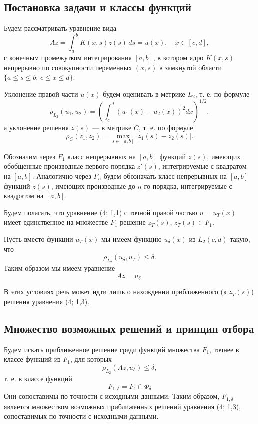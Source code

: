 \documentclass[a4paper,14pt]{extarticle}
\begin{document}
\subsection{Постановка задачи и классы функций}

Будем рассматривать уравнение вида
\begin{equation}
Az = \int_a^b K(x,s) z(s) \, ds = u(x), \quad x \in [c,d], \tag{4; 1,1}
\end{equation}
с конечным промежутком интегрирования \([a,b]\), в котором ядро \(K(x,s)\) непрерывно по совокупности переменных \((x,s)\) в замкнутой области \(\{a \le s \le b; \, c \le x \le d\}\).

Уклонение правой части \(u(x)\) будем оценивать в метрике \(L_2\), т. е. по формуле
\[
\rho_{L_2}(u_1,u_2) = \left( \int_c^d (u_1(x)-u_2(x))^2 dx \right)^{1/2},
\]
а уклонение решения \(z(s)\) — в метрике \(C\), т. е. по формуле
\[
\rho_C(z_1,z_2) = \max_{s \in [a,b]} |z_1(s)-z_2(s)|.
\]

Обозначим через \(F_1\) класс непрерывных на \([a,b]\) функций \(z(s)\), имеющих обобщенные производные первого порядка \(z'(s)\), интегрируемые с квадратом на \([a,b]\). Аналогично через \(F_n\) будем обозначать класс непрерывных на \([a,b]\) функций \(z(s)\), имеющих производные до \(n\)-го порядка, интегрируемые с квадратом на \([a,b]\).

Будем полагать, что уравнение (4; 1,1) с точной правой частью \(u = u_T(x)\) имеет единственное на множестве \(F_1\) решение \(z_T(s)\), \(z_T(s) \in F_1\).

Пусть вместо функции \(u_T(x)\) мы имеем функцию \(u_\delta(x)\) из \(L_2(c,d)\) такую, что
\begin{equation}
\rho_{L_2}(u_\delta, u_T) \le \delta. \tag{4; 1,2}
\end{equation}
Таким образом мы имеем уравнение
\begin{equation}
Az = u_\delta. \tag{4; 1,3}
\end{equation}

В этих условиях речь может идти лишь о нахождении приближенного (к \(z_T(s)\)) решения уравнения (4; 1,3).

\subsection{Множество возможных решений и принцип отбора}

Будем искать приближенное решение среди функций множества \(F_1\), точнее в классе функций из \(F_1\), для которых
\[
\rho_{L_2}(Az, u_\delta) \le \delta,
\]
т. е. в классе функций
\[
F_{1,\delta} = F_1 \cap \Phi_\delta
\]
Они сопоставимы по точности с исходными данными. Таким образом, \(F_{1,\delta}\) является множеством возможных приближенных решений уравнения (4; 1,3), сопоставимых по точности с исходными данными.
\end{document}
